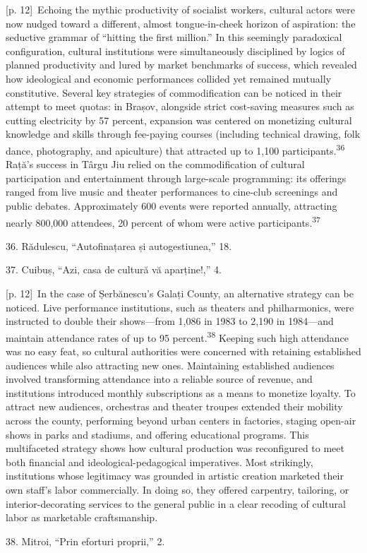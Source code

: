 \documentclass[10pt,a4paper]{article}
\begin{document}
{\scriptsize\color{gray} [p. 12]}\ Echoing the mythic productivity of socialist workers, cultural actors were now nudged toward a different, almost tongue-in-cheek horizon of aspiration: the seductive grammar of “hitting the first million.” In this seemingly paradoxical configuration, cultural institutions were simultaneously disciplined by logics of planned productivity and lured by market benchmarks of success, which revealed how ideological and economic performances collided yet remained mutually constitutive. Several key strategies of commodification can be noticed in their attempt to meet quotas: in Brașov, alongside strict cost-saving measures such as cutting electricity by 57 percent, expansion was centered on monetizing cultural knowledge and skills through fee-paying courses (including technical drawing, folk dance, photography, and apiculture) that attracted up to 1,100 participants.\nobreak\textsuperscript{36} Rață’s success in Târgu Jiu relied on the commodification of cultural participation and entertainment through large-scale programming: its offerings ranged from live music and theater performances to cine-club screenings and public debates. Approximately 600 events were reported annually, attracting nearly 800,000 attendees, 20 percent of whom were active participants.\nobreak\textsuperscript{37}\par{\small 36. Rădulescu, “Autofinațarea și autogestiunea,” 18.\par}{\small 37. Cuibuș, “Azi, casa de cultură vă aparține!,” 4.\par}
{\scriptsize\color{gray} [p. 12]}\ In the case of Șerbănescu’s Galați County, an alternative strategy can be noticed. Live performance institutions, such as theaters and philharmonics, were instructed to double their shows—from 1,086 in 1983 to 2,190 in 1984—and maintain attendance rates of up to 95 percent.\nobreak\textsuperscript{38} Keeping such high attendance was no easy feat, so cultural authorities were concerned with retaining established audiences while also attracting new ones. Maintaining established audiences involved transforming attendance into a reliable source of revenue, and institutions introduced monthly subscriptions as a means to monetize loyalty. To attract new audiences, orchestras and theater troupes extended their mobility across the county, performing beyond urban centers in factories, staging open-air shows in parks and stadiums, and offering educational programs. This multifaceted strategy shows how cultural production was reconfigured to meet both financial and ideological-pedagogical imperatives. Most strikingly, institutions whose legitimacy was grounded in artistic creation marketed their own staff’s labor commercially. In doing so, they offered carpentry, tailoring, or interior-decorating services to the general public in a clear recoding of cultural labor as marketable craftsmanship.\par{\small 38. Mitroi, “Prin eforturi proprii,” 2.\par}
\end{document}
